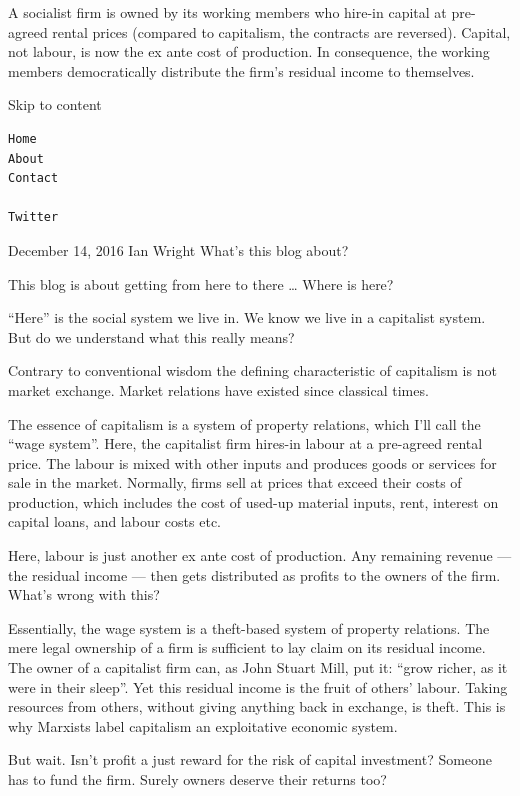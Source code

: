 \documentclass[
]{book}
\begin{document}
A socialist firm is owned by its working members who hire-in capital at pre-agreed rental prices (compared to capitalism, the contracts are reversed). Capital, not labour, is now the ex ante cost of production. In consequence, the working members democratically distribute the firm's residual income to themselves.

Skip to content

\begin{verbatim}
Home
About
Contact

Twitter
\end{verbatim}

December 14, 2016 Ian Wright
What's this blog about?

This blog is about getting from here to there \ldots{}
Where is here?

``Here'' is the social system we live in. We know we live in a capitalist system. But do we understand what this really means?

Contrary to conventional wisdom the defining characteristic of capitalism is not market exchange. Market relations have existed since classical times.

The essence of capitalism is a system of property relations, which I'll call the ``wage system''. Here, the capitalist firm hires-in labour at a pre-agreed rental price. The labour is mixed with other inputs and produces goods or services for sale in the market. Normally, firms sell at prices that exceed their costs of production, which includes the cost of used-up material inputs, rent, interest on capital loans, and labour costs etc.

Here, labour is just another ex ante cost of production. Any remaining revenue --- the residual income --- then gets distributed as profits to the owners of the firm.
What's wrong with this?

Essentially, the wage system is a theft-based system of property relations. The mere legal ownership of a firm is sufficient to lay claim on its residual income. The owner of a capitalist firm can, as John Stuart Mill, put it: ``grow richer, as it were in their sleep''. Yet this residual income is the fruit of others' labour. Taking resources from others, without giving anything back in exchange, is theft. This is why Marxists label capitalism an exploitative economic system.

But wait. Isn't profit a just reward for the risk of capital investment? Someone has to fund the firm. Surely owners deserve their returns too?
\end{document}

